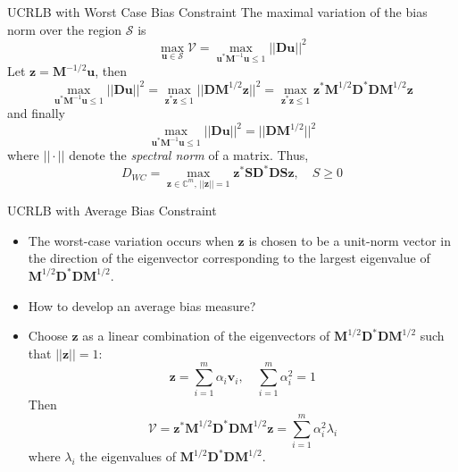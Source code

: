 \documentclass{beamer}
\begin{document}
\begin{frame}{UCRLB with Worst Case Bias Constraint}
The maximal variation of the bias norm over the region $\mathcal{S}$ is
\[
\max_{\mathbf{u} \in \mathcal{S}} \mathcal{V} = 
\max_{\mathbf{u}^*\mathbf{M}^{-1}\mathbf{u} \leq 1} ||\mathbf{D u}||^2
\]
Let $\mathbf{z} = \mathbf{M}^{-1/2}\mathbf{u}$, then
\[
\max_{\mathbf{u}^*\mathbf{M}^{-1}\mathbf{u} \leq 1} ||\mathbf{D u}||^2 = 
\max_{\mathbf{z}^*\mathbf{z} \leq 1} ||\mathbf{D} \mathbf{M}^{1/2}\mathbf{z}||^2 = 
\max_{\mathbf{z}^*\mathbf{z} \leq 1} \mathbf{z}^* \mathbf{M}^{1/2} \mathbf{D}^* \mathbf{D} 
\mathbf{M}^{1/2} \mathbf{z}
\]
and finally
\[
\max_{\mathbf{u}^*\mathbf{M}^{-1}\mathbf{u} \leq 1} ||\mathbf{D u}||^2 = 
||\mathbf{D} \mathbf{M}^{1/2}||^2
\]
where $|| \cdot ||$ denote the \textit{spectral norm} of a matrix. Thus,
\[
D_{WC} = 
\max_{\mathbf{z} \in \mathbb{C}^m, \, ||\mathbf{z}|| = 1} \mathbf{z}^* \mathbf{S} \mathbf{D}^* \mathbf{D} 
\mathbf{S} \mathbf{z}, \quad S \geq 0
\]
\end{frame}

\begin{frame}{UCRLB with Average Bias Constraint}
\begin{itemize}
    \item The worst-case variation occurs when $\mathbf{z}$ is chosen to be a unit-norm vector in the direction
    of the eigenvector corresponding to the largest eigenvalue of 
    $\mathbf{M}^{1/2} \mathbf{D}^* \mathbf{D} \mathbf{M}^{1/2}$.
    \item How to develop an average bias measure?
    \item Choose $\mathbf{z}$ as a linear combination of the eigenvectors of 
    $\mathbf{M}^{1/2} \mathbf{D}^* \mathbf{D} \mathbf{M}^{1/2}$ such that 
    $||\mathbf{z}||=1$:
    \[
        \mathbf{z} = \sum_{i=1}^m \alpha_i \mathbf{v}_i, \quad \sum_{i=1}^m \alpha_i^2 = 1
    \]
    Then
    \[
        \mathcal{V} = \mathbf{z}^* \mathbf{M}^{1/2} \mathbf{D}^* \mathbf{D} \mathbf{M}^{1/2} \mathbf{z} =
        \sum_{i=1}^m \alpha_i^2 \lambda_i
    \]
    where $\lambda_i$ the eigenvalues of $\mathbf{M}^{1/2} \mathbf{D}^* \mathbf{D} \mathbf{M}^{1/2}$.
\end{itemize}
\end{frame}
\end{document}
